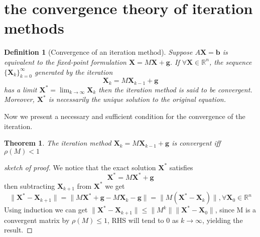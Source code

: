 \documentclass[12pt]{amsart}
\newtheorem{theorem}{Theorem}[section]
\newtheorem{definition}{Definition}[section]
\begin{document}
\section{the convergence theory of iteration methods}
\begin{definition}[Convergence of an iteration method]
    Suppose $A\bm{X}=\bm{b}$ is equivalent to the fixed-point formulation $\bm{X}=M\bm{X}+\bm{g}$. If $\forall \bm{X} \in \mathbb{R}^n$, 
    the sequence $\{\bm{X}_k\}_{k=0}^\infty$ generated by the iteration \[\bm{X}_k=M\bm{X}_{k-1}+\bm{g}\] has a limit $\bm{X}^*=\lim_{k \to \infty}\bm{X}_k$
    then the iteration method is said to be convergent. Moreover, $\bm{X}^*$ is necessarily the unique solution to the original equation.
\end{definition}

Now we present a necessary and sufficient condition for the convergence of the iteration.

\begin{theorem}
    The iteration method $\bm{X}_k=M\bm{X}_{k-1}+\bm{g}$ is convergent iff $\rho(M)<1$
\end{theorem}
\begin{proof}[sketch of proof]
    We notice that the exact solution $\bm{X}^*$ satisfies \[\bm{X}^*=M\bm{X}^*+\bm{g}\] then subtracting $\bm{X}_{k+1}$ from $\bm{X}^*$ we get
    \[
    \|\bm{X}^*-\bm{X}_{k+1}\| = \|M\bm{X}^*+\bm{g}-M\bm{X}_k-\bm{g}\| = \|M(\bm{X}^*-\bm{X}_k)\|, \forall \bm{X}_0 \in \mathbb{R}^n
    \]
    Using induction we can get $\|\bm{X}^*-\bm{X}_{k+1}\|\leq\|M^k\|\|\bm{X}^*-\bm{X}_0\|$, since M is a convergent matrix by $\rho(M)\leq1$, RHS will
    tend to 0 as $k\to\infty$, yielding the result.
\end{proof}
\end{document}
